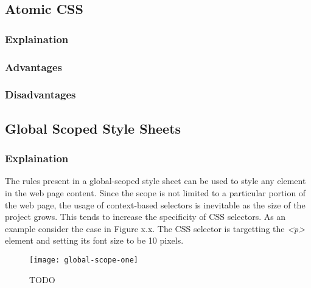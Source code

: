 \documentclass[12pt]{article}
\begin{document}
\subsection{Atomic CSS}
\subsubsection{Explaination}

\subsubsection{Advantages}
\subsubsection{Disadvantages}

\subsection{Global Scoped Style Sheets}
\subsubsection{Explaination}

The rules present in a global-scoped style sheet can be used to style any element in the web page content. Since the scope is not limited to a particular portion of the web page, the usage of context-based selectors is inevitable as the size of the project grows. This tends to increase the specificity of CSS selectors. As an example consider the case in Figure x.x. The CSS selector is targetting the \textit{<p>} element and setting its font size to be 10 pixels.


\vspace{0.5cm}

\begin{figure}[h]
\texttt{[image: global-scope-one]}
\centering
\caption{TODO}
\end{figure}

\vspace{0.5cm}
\end{document}
